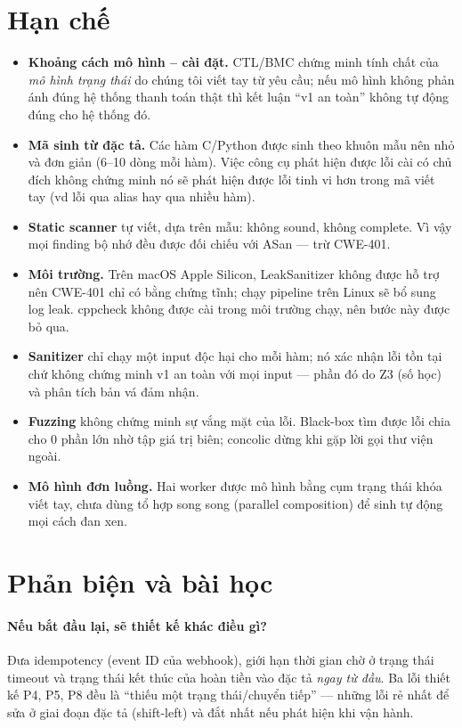 \section{Hạn chế}
\begin{itemize}
  \item \textbf{Khoảng cách mô hình -- cài đặt.} CTL/BMC chứng minh tính chất của \emph{mô hình
        trạng thái} do chúng tôi viết tay từ yêu cầu; nếu mô hình không phản ánh đúng hệ thống
        thanh toán thật thì kết luận ``v1 an toàn'' không tự động đúng cho hệ thống đó.
  \item \textbf{Mã sinh từ đặc tả.} Các hàm C/Python được sinh theo khuôn mẫu nên nhỏ và đơn
        giản (6--10 dòng mỗi hàm). Việc công cụ phát hiện được lỗi cài có chủ đích không chứng minh
        nó sẽ phát hiện được lỗi tinh vi hơn trong mã viết tay (vd lỗi qua alias hay qua nhiều hàm).
  \item \textbf{Static scanner} tự viết, dựa trên mẫu: không sound, không complete. Vì vậy mọi
        finding bộ nhớ đều được đối chiếu với ASan — trừ CWE-401.
  \item \textbf{Môi trường.} Trên macOS Apple Silicon, LeakSanitizer không được hỗ trợ nên
        CWE-401 chỉ có bằng chứng tĩnh; chạy pipeline trên Linux sẽ bổ sung log leak.
        cppcheck không được cài trong môi trường chạy, nên bước này được bỏ qua.
  \item \textbf{Sanitizer} chỉ chạy một input độc hại cho mỗi hàm; nó xác nhận lỗi tồn tại chứ
        không chứng minh v1 an toàn với mọi input — phần đó do Z3 (số học) và phân tích bản vá đảm
        nhận.
  \item \textbf{Fuzzing} không chứng minh sự vắng mặt của lỗi. Black-box tìm được lỗi chia cho 0
        phần lớn nhờ tập giá trị biên; concolic dừng khi gặp lời gọi thư viện ngoài.
  \item \textbf{Mô hình đơn luồng.} Hai worker được mô hình bằng cụm trạng thái khóa viết tay, chưa
        dùng tổ hợp song song (parallel composition) để sinh tự động mọi cách đan xen.
\end{itemize}

\section{Phản biện và bài học}
\paragraph{Nếu bắt đầu lại, sẽ thiết kế khác điều gì?}
Đưa idempotency (event ID của webhook), giới hạn thời gian chờ ở trạng thái timeout và trạng thái
kết thúc của hoàn tiền vào đặc tả \emph{ngay từ đầu}. Ba lỗi thiết kế P4, P5, P8 đều là ``thiếu
một trạng thái/chuyển tiếp'' — những lỗi rẻ nhất để sửa ở giai đoạn đặc tả (shift-left) và đắt
nhất nếu phát hiện khi vận hành.


